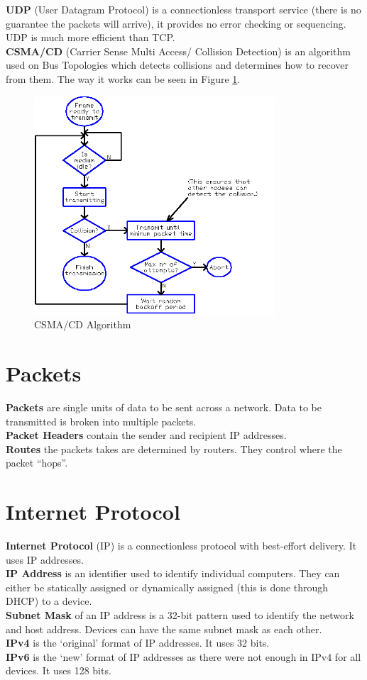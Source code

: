 \documentclass[a4paper,11pt]{article}
\begin{document}
\textbf{UDP} (User Datagram Protocol) is a connectionless transport service (there is no guarantee the packets will arrive), it provides no error checking or sequencing. UDP is much more efficient than TCP.\\
\textbf{CSMA/CD} (Carrier Sense Multi Access/ Collision Detection) is an algorithm used on Bus Topologies which detects collisions and determines how to recover from them. The way it works can be seen in Figure \ref*{fig:csmacd}. 

\begin{figure}[ht]
    \centering
    \includegraphics[width=0.8\textwidth]{../assets/csmacd.png}
    \caption{CSMA/CD Algorithm}
    \label{fig:csmacd}
\end{figure}

\section{Packets}
\textbf{Packets} are single units of data to be sent across a network. Data to be transmitted is broken into multiple packets.\\
\textbf{Packet Headers} contain the sender and recipient IP addresses.\\
\textbf{Routes} the packets takes are determined by routers. They control where the packet ``hops''. 

\section{Internet Protocol}
\textbf{Internet Protocol} (IP) is a connectionless protocol with best-effort delivery. It uses IP addresses.\\
\textbf{IP Address} is an identifier used to identify individual computers. They can either be statically assigned or dynamically assigned (this is done through DHCP) to a device.\\
\textbf{Subnet Mask} of an IP address is a 32-bit pattern used to identify the network and host address. Devices can have the same subnet mask as each other.\\
\textbf{IPv4} is the `original' format of IP addresses. It uses 32 bits.\\
\textbf{IPv6} is the `new' format of IP addresses as there were not enough in IPv4 for all devices. It uses 128 bits. 
\end{document}
